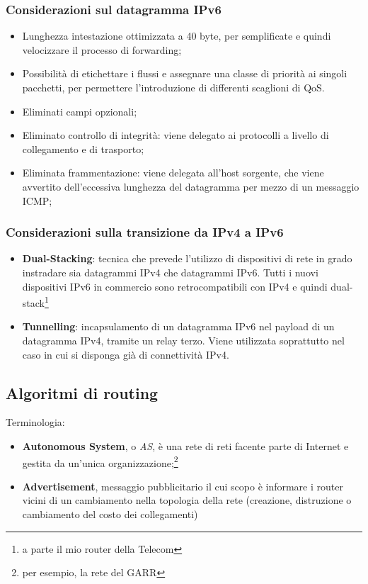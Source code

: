 \documentclass[12pt,a4paper]{article}
\begin{document}
\subsubsection{Considerazioni sul datagramma IPv6}
\begin{itemize}
  \item Lunghezza intestazione ottimizzata a 40 byte, per semplificate
    e quindi velocizzare il processo di forwarding;
  \item Possibilità di etichettare i flussi e assegnare una classe di
    priorità ai singoli pacchetti, per permettere l'introduzione di
    differenti scaglioni di QoS.
  \item Eliminati campi opzionali;
  \item Eliminato controllo di integrità: viene delegato ai protocolli
    a livello di collegamento e di trasporto;
  \item Eliminata frammentazione: viene delegata all'host sorgente,
    che viene avvertito dell'eccessiva lunghezza del datagramma per
    mezzo di un messaggio ICMP;
\end{itemize}

\subsubsection{Considerazioni sulla transizione da IPv4 a IPv6}
\begin{itemize}
  \item \textbf{Dual-Stacking}: tecnica che prevede l'utilizzo di
  dispositivi di rete in grado instradare sia datagrammi IPv4 che
  datagrammi IPv6. Tutti i nuovi dispositivi IPv6 in commercio sono
  retrocompatibili con IPv4 e quindi dual-stack\footnote{a parte il mio
  router della Telecom}
  \item \textbf{Tunnelling}: incapsulamento di un datagramma IPv6 nel
  payload di un datagramma IPv4, tramite un relay terzo. Viene
  utilizzata soprattutto nel caso in cui si disponga già di connettività
  IPv4.
\end{itemize}

\subsection{Algoritmi di routing}
Terminologia:
\begin{itemize}
  \item \textbf{Autonomous System}, o \emph{AS}, è una rete di reti
    facente parte di Internet e gestita da un'unica
    organizzazione;\footnote{per esempio, la rete del GARR}
  \item \textbf{Advertisement}, messaggio pubblicitario il cui scopo è
    informare i router vicini di un cambiamento nella topologia della
    rete (creazione, distruzione o cambiamento del costo dei collegamenti)
\end{itemize}
\end{document}
